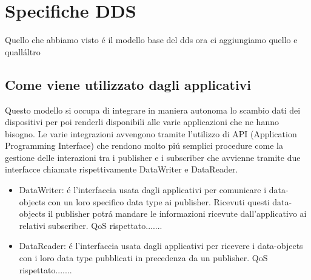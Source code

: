 \section{Specifiche DDS}
Quello che abbiamo visto é il modello base del dds
ora ci aggiungiamo quello e qualláltro

\subsection{Come viene utilizzato dagli applicativi}








Questo modello si occupa di integrare in maniera autonoma lo
scambio dati dei dispositivi per poi renderli disponibili alle
varie applicazioni che ne hanno bisogno. Le varie integrazioni avvengono
tramite l'utilizzo di API (Application Programming Interface) che rendono
molto piú semplici procedure come la gestione delle
interazioni tra i publisher e i subscriber che avvienne tramite
due interfacce chiamate rispettivamente DataWriter e DataReader.
\begin{itemize}
    \item DataWriter: é l'interfaccia usata dagli applicativi 
    per comunicare i
    data-objects con un loro specifico data type ai publisher.
    Ricevuti questi data-objects il publisher potrá mandare le
    informazioni ricevute dall'applicativo ai relativi subscriber.
    QoS rispettato.......
    \item DataReader: é l'interfaccia usata dagli applicativi per
    ricevere i data-objects con i loro data type pubblicati in
    precedenza da un publisher. QoS rispettato.......
\end{itemize}\cite{dds1.4}

